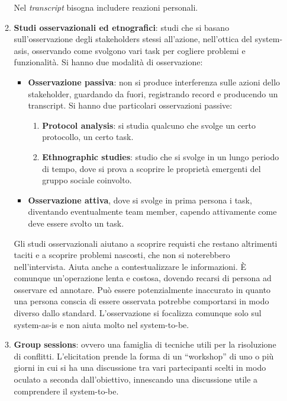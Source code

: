 \begin{itemize}
\begin{enumerate}
                    Nel \textit{transcript} bisogna includere reazioni personali.
              \item \textbf{Studi osservazionali ed etnografici}: studi che si basano
                    sull'osservazione degli stakeholders stessi all'azione, nell'ottica del
                    system-asis, osservando come svolgono vari task per cogliere problemi e
                    funzionalità. Si hanno due modalità di osservazione:
                    \begin{itemize}
                        \item \textbf{Osservazione passiva}: non si produce interferenza
                              sulle azioni dello stakeholder, guardando da fuori, registrando record e
                              producendo un transcript. Si hanno due particolari osservazioni passive:
                              \begin{enumerate}
                                  \item \textbf{Protocol analysis}: si studia qualcuno che svolge
                                        un certo protocollo, un certo task.
                                  \item \textbf{Ethnographic studies}: studio che si svolge in un
                                        lungo periodo di tempo, dove si prova a scoprire le proprietà
                                        emergenti del gruppo sociale coinvolto.
                              \end{enumerate}
                        \item \textbf{Osservazione attiva}, dove si svolge in prima persona
                              i task, diventando eventualmente team member, capendo attivamente
                              come deve essere svolto un task.
                    \end{itemize}

                    Gli studi osservazionali aiutano a scoprire requisti che restano altrimenti
                    taciti e a scoprire problemi nascosti, che non si noterebbero nell'intervista.
                    Aiuta anche a contestualizzare le informazioni. È comunque un'operazione
                    lenta e costosa, dovendo recarsi di persona ad osservare ed annotare. Può
                    essere potenzialmente inaccurato in quanto una persona conscia di essere
                    osservata potrebbe comportarsi in modo diverso dallo standard. L'osservazione
                    si focalizza comunque solo sul system-as-is e non aiuta molto nel system-to-be.
              \item \textbf{Group sessions}: ovvero una famiglia di tecniche utili per
                    la risoluzione di conflitti. L'elicitation prende la forma di un “workshop”
                    di uno o più giorni in cui si ha una discussione tra vari partecipanti
                    scelti in modo oculato a seconda dall'obiettivo, innescando una discussione
                    utile a comprendere il system-to-be.


\end{enumerate}
\end{itemize}
